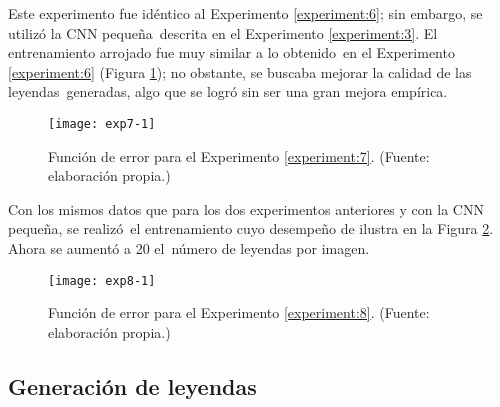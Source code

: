 \begin{experiment} \label{experiment:7}
  Este experimento fue idéntico al Experimento \ref{experiment:6}; sin embargo, se utilizó la CNN pequeña\
  descrita en el Experimento \ref{experiment:3}. El entrenamiento arrojado fue muy similar a lo obtenido\
  en el Experimento \ref{experiment:6} (Figura \ref{exp7}); no obstante, se buscaba mejorar la calidad de las leyendas\
  generadas, algo que se logró sin ser una gran mejora empírica.
\end{experiment}

\begin{figure}[h]
  \texttt{[image: exp7-1]}
  \caption{
    Función de error para el Experimento \ref{experiment:7}.
    (Fuente: elaboración propia.)
  }
  \label{exp7}
\end{figure}

\begin{experiment} \label{experiment:8}
  Con los mismos datos que para los dos experimentos anteriores y con la CNN pequeña, se realizó\
  el entrenamiento cuyo desempeño de ilustra en la Figura \ref{exp8}. Ahora se aumentó a 20 el\
  número de leyendas por imagen.
\end{experiment}

\begin{figure}[h]
  \texttt{[image: exp8-1]}
  \caption{
    Función de error para el Experimento \ref{experiment:8}.
    (Fuente: elaboración propia.)
  }
  \label{exp8}
\end{figure}

\subsection{Generación de leyendas}

